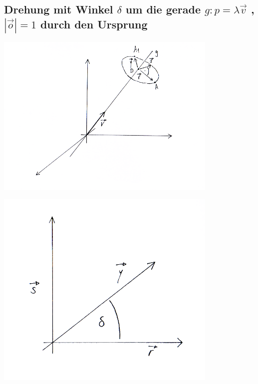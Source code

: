 \documentclass[a4paper,10pt]{report}
\begin{document}
\subsection{Drehung mit Winkel $\delta $ um die gerade $g: p = \lambda \vec{v}$ , $|\vec{o}| = 1$ durch den Ursprung}
\begin{center}
	 \includegraphics[width=0.8\textwidth]{imgs/drehungMitWinkel1.png}
 \end{center}
\begin{center}
	 \includegraphics[width=0.8\textwidth]{imgs/drehungMitWinkel2.png}
 \end{center}
\end{document}
